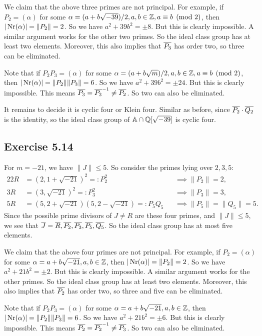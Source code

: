 \documentclass[../Marcus.tex]{subfiles}
\begin{document}
We claim that the above three primes are not principal. For example, if $P_2 = (\alpha)$ for some $\alpha = (a+b\sqrt{-39})/2,a,b\in\mathbb{Z},a \equiv b \pmod{2}$, then $|\operatorname{Nr}(\alpha)| = \|P_2\| = 2$. So we have $a^2+39b^2 = \pm8$. But this is clearly impossible. A similar argument works for the other two primes. So the ideal class group has at least two elements. Moreover, this also implies that $\overline{P_3}$ has order two, so three can be eliminated.

Note that if $P_2P_3 = (\alpha)$ for some $\alpha = (a+b\sqrt{m})/2,a,b\in\mathbb{Z},a \equiv b \pmod{2}$, then $|\operatorname{Nr}(\alpha)| = \|P_2\|\|P_3\| = 6$. So we have $a^2+39b^2 = \pm24$. But this is clearly impossible. This means $\overline{P_3} = \overline{P_3}^{-1} \neq \overline{P_2}$. So two can also be eliminated.

It remains to decide it is cyclic four or Klein four. Similar as before, since $\overline{P_2} \cdot \overline{Q_2}$ is the identity, so the ideal class group of $\mathbb{A} \cap \mathbb{Q}[\sqrt{-39}]$ is cyclic four.

\subsection*{Exercise 5.14}

For $m=-21$, we have $\|J\| \leq 5$. So consider the primes lying over $2,3,5$:
\begin{alignat*}{2}
2R &= (2,1+\sqrt{-21})^2 =: P_2^2  &&\implies \|P_2\| = 2,    \\
3R &= (3,\sqrt{-21})^2 =: P_3^2     &&\implies \|P_3\| = 3,    \\
5R &= (5,2+\sqrt{-21})(5,2-\sqrt{-21}) =: P_5Q_5  &&\implies \|P_5\| = \|Q_5\| = 5.
\end{alignat*}
Since the possible prime divisors of $J\neq R$ are these four primes, and $\|J\| \leq 5$, we see that $\overline{J}=\overline{R},\overline{P_2},\overline{P_3},\overline{P_5},\overline{Q_5}$. So the ideal class group has at most five elements.

We claim that the above four primes are not principal. For example, if $P_2 = (\alpha)$ for some $\alpha=a+b\sqrt{-21},a,b\in \mathbb{Z}$, then $|\operatorname{Nr}(\alpha)| = \|P_2\| = 2$. So we have $a^2+21b^2 = \pm2$. But this is clearly impossible. A similar argument works for the other primes. So the ideal class group has at least two elements. Moreover, this also implies that $\overline{P_2}$ has order two, so three and five can be eliminated.

Note that if $P_2P_3 = (\alpha)$ for some $\alpha=a+b\sqrt{-21},a,b\in \mathbb{Z}$, then $|\operatorname{Nr}(\alpha)| = \|P_2\|\|P_3\| = 6$. So we have $a^2+21b^2 = \pm6$. But this is clearly impossible. This means $\overline{P_2} = \overline{P_2}^{-1} \neq \overline{P_3}$. So two can also be eliminated.
\end{document}
